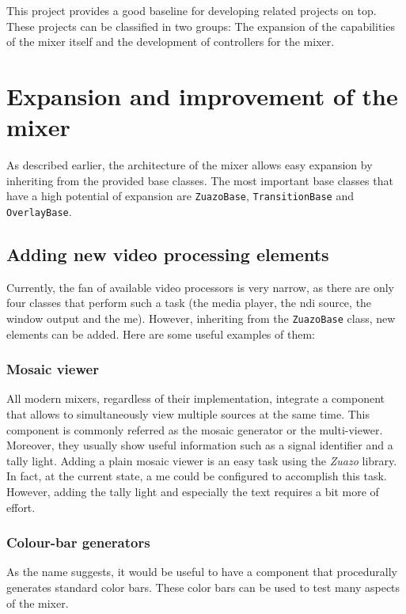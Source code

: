 \documentclass[../main.tex]{subfiles}
\begin{document}
\label{chap:future}

This project provides a good baseline for developing related projects on top. These projects can be classified in two groups: The expansion of the capabilities of the mixer itself and the development of controllers for the mixer.\newline

\section{Expansion and improvement of the mixer}
As described earlier, the architecture of the mixer allows easy expansion by inheriting from the provided base classes. The most important base classes that have a high potential of expansion are \texttt{ZuazoBase}, \texttt{TransitionBase} and \texttt{OverlayBase}.\newline

\subsection{Adding new video processing elements}
Currently, the fan of available video processors is very narrow, as there are only four classes that perform such a task (the media player, the \gls{ndi} source, the window output and the \gls{me}). However, inheriting from the \texttt{ZuazoBase} class, new elements can be added. Here are some useful examples of them:\newline

\subsubsection{Mosaic viewer}
All modern mixers, regardless of their implementation, integrate a component that allows to simultaneously view multiple sources at the same time. This component is commonly referred as the mosaic generator or the multi-viewer. Moreover, they usually show useful information such as a signal identifier and a tally light. Adding a plain mosaic viewer is an easy task using the \textit{Zuazo} library. In fact, at the current state, a \gls{me} could be configured to accomplish this task. However, adding the tally light and especially the text requires a bit more of effort.\newline

\subsubsection{Colour-bar generators}
As the name suggests, it would be useful to have a component that procedurally generates standard color bars. These color bars can be used to test many aspects of the mixer.\newline
\end{document}
